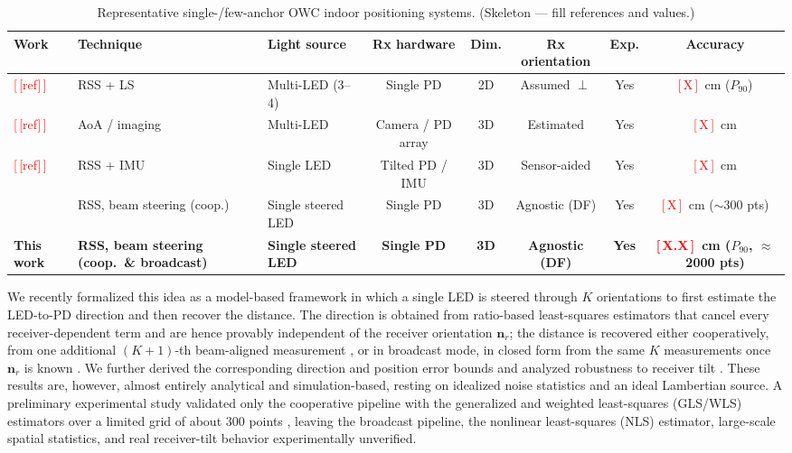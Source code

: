 \documentclass[journal]{IEEEtran}
\newcommand{\ph}[1]{\textcolor{red}{[\,#1\,]}}
\begin{document}
\begin{table}[!t]
\centering
\caption{Representative single-/few-anchor OWC indoor positioning systems. \textcolor{figcol}{(Skeleton --- fill references and values.)}}
\label{tab:sota}
\begin{tabular}{@{}lllccccc@{}}
\toprule
Work & Technique & Light source & Rx hardware & Dim. & Rx orientation & Exp. & Accuracy \\
\midrule
\ph{[ref]} & RSS + LS       & Multi-LED (3--4) & Single PD         & 2D & Assumed $\perp$ & Yes & \ph{X}~cm ($P_{90}$) \\
\ph{[ref]} & AoA / imaging  & Multi-LED        & Camera / PD array & 3D & Estimated       & Yes & \ph{X}~cm \\
\ph{[ref]} & RSS + IMU      & Single LED       & Tilted PD / IMU   & 3D & Sensor-aided    & Yes & \ph{X}~cm \\
\cite{acuna2026experimental} & RSS, beam steering (coop.) & Single steered LED & Single PD & 3D & Agnostic (DF) & Yes & \ph{X}~cm ($\sim$300 pts) \\
\midrule
\textbf{This work} & \textbf{RSS, beam steering (coop.\ \& broadcast)} & \textbf{Single steered LED} & \textbf{Single PD} & \textbf{3D} & \textbf{Agnostic (DF)} & \textbf{Yes} & \textbf{\ph{X.X}~cm ($P_{90}$, $\approx$2000 pts)} \\
\bottomrule
\end{tabular}
\end{table}

We recently formalized this idea as a model-based framework in which a single LED is steered through $K$ orientations to first estimate the LED-to-PD direction and then recover the distance. The direction is obtained from ratio-based least-squares estimators that cancel every receiver-dependent term and are hence provably independent of the receiver orientation $\mathbf{n}_r$; the distance is recovered either cooperatively, from one additional $(K{+}1)$-th beam-aligned measurement \cite{acuna2025model}, or in broadcast mode, in closed form from the same $K$ measurements once $\mathbf{n}_r$ is known \cite{acuna2026broadcast}. We further derived the corresponding direction and position error bounds and analyzed robustness to receiver tilt \cite{acuna2026robust}. These results are, however, almost entirely analytical and simulation-based, resting on idealized noise statistics and an ideal Lambertian source. A preliminary experimental study validated only the cooperative pipeline with the generalized and weighted least-squares (GLS/WLS) estimators over a limited grid of about $300$ points \cite{acuna2026experimental}, leaving the broadcast pipeline, the nonlinear least-squares (NLS) estimator, large-scale spatial statistics, and real receiver-tilt behavior experimentally unverified.
\end{document}
